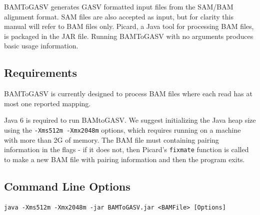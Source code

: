 \documentclass[11pt]{article}
\begin{document}
BAMToGASV generates GASV formatted input files from the SAM/BAM alignment format. SAM files are also accepted as input, but for clarity this manual will refer to BAM files only.  Picard, a Java tool for processing BAM files, is packaged in the JAR file. Running BAMToGASV with no arguments produces basic usage information.

\subsection{Requirements}
   
BAMToGASV is currently designed to process BAM files where each read has at most one reported mapping. 

 Java 6 is required to run BAMtoGASV.  We suggest initializing the Java heap size using the \texttt{-Xms512m -Xmx2048m} options, which requires running on a machine with more than 2G of memory.  The BAM file must containing pairing information in the flags - if it does not, then Picard's \texttt{fixmate} function is called to make a new BAM file with pairing information and then the program exits.  



\subsection{Command Line Options}
\label{sec:BTGCLO}

\begin{Verbatim}[frame=single]
java -Xms512m -Xmx2048m -jar BAMToGASV.jar <BAMFile> [Options]
\end{Verbatim}
     
\end{document}
